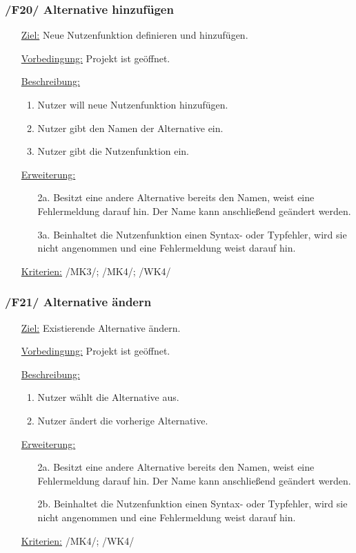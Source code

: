 \documentclass{article}
\begin{document}
\subsubsection*{/F20/ Alternative hinzufügen}
\begin{itemize}
    \item[\underline{Ziel:}] Neue Nutzenfunktion definieren und hinzufügen.
    \item[\underline{Vorbedingung:}] Projekt ist geöffnet.
    \item[\underline{Beschreibung:}]
    \begin{enumerate}
        \item Nutzer will neue Nutzenfunktion hinzufügen.
        \item Nutzer gibt den Namen der Alternative ein.
        \item Nutzer gibt die Nutzenfunktion ein.
    \end{enumerate}
    \item[\underline{Erweiterung:}]
    \begin{itemize}
        \item[2a.] Besitzt eine andere Alternative bereits den Namen, weist eine Fehlermeldung darauf hin. Der Name kann anschließend geändert werden.
        \item[3a.] Beinhaltet die Nutzenfunktion einen Syntax- oder Typfehler, wird sie nicht angenommen und eine Fehlermeldung weist darauf hin.
    \end{itemize}
    \item[\underline{Kriterien:}] /MK3/; /MK4/; /WK4/
\end{itemize}

\subsubsection*{/F21/ Alternative ändern}
\begin{itemize}
    \item[\underline{Ziel:}] Existierende Alternative ändern.
    \item[\underline{Vorbedingung:}] Projekt ist geöffnet. 
    \item[\underline{Beschreibung:}]
    \begin{enumerate}
        \item Nutzer wählt die Alternative aus.
        \item Nutzer ändert die vorherige Alternative.
    \end{enumerate}
    \item[\underline{Erweiterung:}]
    \begin{itemize}
        \item[2a.] Besitzt eine andere Alternative bereits den Namen, weist eine Fehlermeldung darauf hin. Der Name kann anschließend geändert werden.
        \item[2b.] Beinhaltet die Nutzenfunktion einen Syntax- oder Typfehler, wird sie nicht angenommen und eine Fehlermeldung weist darauf hin.
    \end{itemize}
    \item[\underline{Kriterien:}] /MK4/; /WK4/
\end{itemize}
\end{document}
